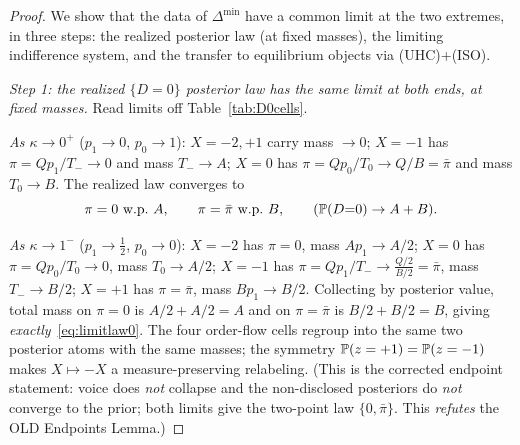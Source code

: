 \begin{proof}
We show that the data of $\Delta^{\min}$ have a common limit at the two extremes,
in three steps: the realized posterior law (at fixed masses), the limiting
indifference system, and the transfer to equilibrium objects via (UHC)+(ISO).

\emph{Step 1: the realized $\{D=0\}$ posterior law has the same limit at both
ends, at fixed masses.} Read limits off Table~\ref{tab:D0cells}.

\emph{As $\kappa\to0^{+}$} ($p_1\to0$, $p_0\to1$): $X{=}{-}2,{+}1$ carry mass
$\to0$; $X{=}{-}1$ has $\pi=Q p_1/T_-\to0$ and mass $T_-\to A$; $X{=}0$ has
$\pi=Q p_0/T_0\to Q/B=\bar\pi$ and mass $T_0\to B$. The realized law converges to
\begin{equation}\label{eq:limitlaw0}
   \pi=0\ \text{w.p.}\ A,\qquad \pi=\bar\pi\ \text{w.p.}\ B,
   \qquad(\mathbb{P}(D{=}0)\to A+B).
\end{equation}

\emph{As $\kappa\to1^{-}$} ($p_1\to\tfrac12$, $p_0\to0$): $X{=}{-}2$ has $\pi=0$,
mass $A p_1\to A/2$; $X{=}0$ has $\pi=Q p_0/T_0\to0$, mass $T_0\to A/2$;
$X{=}{-}1$ has $\pi=Q p_1/T_-\to \tfrac{Q/2}{B/2}=\bar\pi$, mass $T_-\to B/2$;
$X{=}{+}1$ has $\pi=\bar\pi$, mass $B p_1\to B/2$. Collecting by posterior value,
total mass on $\pi=0$ is $A/2+A/2=A$ and on $\pi=\bar\pi$ is $B/2+B/2=B$, giving
\emph{exactly}~\eqref{eq:limitlaw0}. The four order-flow cells regroup into the
same two posterior atoms with the same masses; the symmetry $\mathbb{P}(z=+1)=\mathbb{P}(z=-1)$
makes $X\mapsto-X$ a measure-preserving relabeling. (This is the corrected
endpoint statement: voice does \emph{not} collapse and the non-disclosed
posteriors do \emph{not} converge to the prior; both limits give the two-point
law $\{0,\bar\pi\}$. This \emph{refutes} the OLD Endpoints Lemma.)


\end{proof}
